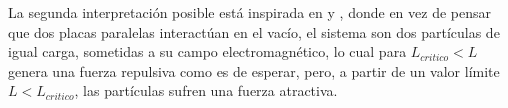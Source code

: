 La segunda interpretación posible está inspirada en \cite{MILTON198049} y \cite{Beauregard_2013}, donde en vez de pensar que dos placas paralelas interactúan en el vacío, el sistema son dos partículas de igual carga, sometidas a su campo electromagnético, lo cual para $L _{critico} < L$ genera una fuerza repulsiva como es de esperar, pero, a partir de un valor límite $L < L _{critico}$, las partículas sufren una fuerza atractiva.









